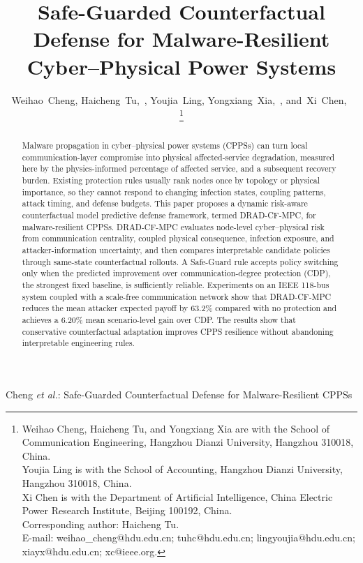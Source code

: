 \documentclass[lettersize,journal]{IEEEtran}
\begin{document}
\title{Safe-Guarded Counterfactual Defense for Malware-Resilient Cyber--Physical Power Systems}

\author{
Weihao~Cheng,
Haicheng~Tu,~,
Youjia~Ling,
Yongxiang~Xia,~,
and~Xi~Chen,~%

\thanks{
Weihao Cheng, Haicheng Tu, and Yongxiang Xia are with the School of Communication Engineering, Hangzhou Dianzi University, Hangzhou 310018, China.\\
Youjia Ling is with the School of Accounting, Hangzhou Dianzi University, Hangzhou 310018, China.\\
Xi Chen is with the Department of Artificial Intelligence, China Electric Power Research Institute, Beijing 100192, China.\\
Corresponding author: Haicheng Tu.\\
E-mail: weihao\_cheng@hdu.edu.cn; tuhc@hdu.edu.cn; lingyoujia@hdu.edu.cn; xiayx@hdu.edu.cn; xc@ieee.org.
}
}

%
{Cheng \MakeLowercase{\textit{et al.}}: Safe-Guarded Counterfactual Defense for Malware-Resilient CPPSs}

\maketitle

\begin{abstract}
Malware propagation in cyber--physical power systems (CPPSs) can turn local communication-layer compromise into physical affected-service degradation, measured here by the physics-informed percentage of affected service, and a subsequent recovery burden. Existing protection rules usually rank nodes once by topology or physical importance, so they cannot respond to changing infection states, coupling patterns, attack timing, and defense budgets. This paper proposes a dynamic risk-aware counterfactual model predictive defense framework, termed DRAD-CF-MPC, for malware-resilient CPPSs. DRAD-CF-MPC evaluates node-level cyber--physical risk from communication centrality, coupled physical consequence, infection exposure, and attacker-information uncertainty, and then compares interpretable candidate policies through same-state counterfactual rollouts. A Safe-Guard rule accepts policy switching only when the predicted improvement over communication-degree protection (CDP), the strongest fixed baseline, is sufficiently reliable. Experiments on an IEEE 118-bus system coupled with a scale-free communication network show that DRAD-CF-MPC reduces the mean attacker expected payoff by 63.2\% compared with no protection and achieves a 6.20\% mean scenario-level gain over CDP. The results show that conservative counterfactual adaptation improves CPPS resilience without abandoning interpretable engineering rules.
\end{abstract}
\end{document}
